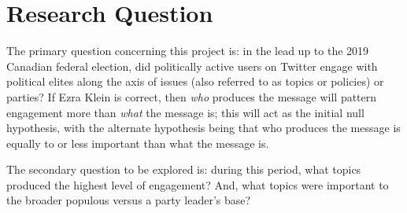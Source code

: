 \section{Research Question}

The primary question concerning this project is: in the lead up to the 2019
Canadian federal election, did politically active users on Twitter engage with
political elites along the axis of issues (also referred to as topics or
policies) or parties? If Ezra Klein is correct, then \emph{who} produces the
message will pattern engagement more than \emph{what} the message is; this will
act as the initial null hypothesis, with the alternate hypothesis being that who
produces the message is equally to or less important than what the message is. 

The secondary question to be explored is: during this period, what topics
produced the highest level of engagement? And, what topics were important to the
broader populous versus a party leader’s base?

